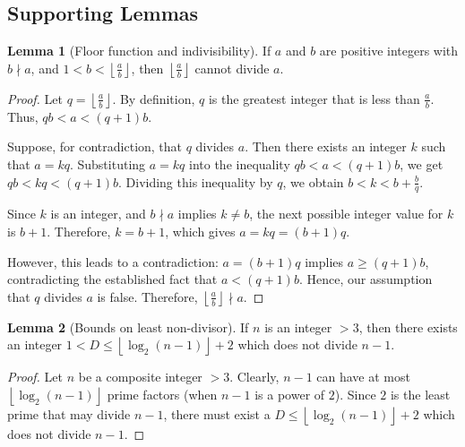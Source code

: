 \documentclass{article}
\theoremstyle{plain}
\theoremstyle{definition}
\newtheorem{lemma}{Lemma}
\begin{document}
\subsection{Supporting Lemmas}

\begin{lemma}[Floor function and indivisibility]
\label{lemma:floornondivisor}
If \(a\) and \(b\) are positive integers with \(b \nmid a\), 
and \( 1 < b < \left\lfloor \frac{a}{b} \right\rfloor \), then \(\left\lfloor \frac{a}{b} \right\rfloor\) 
cannot divide \(a\).
\end{lemma}
\begin{proof}
Let \(q = \left\lfloor \frac{a}{b} \right\rfloor\). By definition, \(q\) is the greatest integer that is less than \(\frac{a}{b}\). Thus, \(qb < a < (q + 1)b\).

Suppose, for contradiction, that \(q\) divides \(a\). Then there exists an integer \(k\) such that \(a = k q\). Substituting \(a = k q\) into the inequality \(qb < a < (q + 1) b\), we get \(qb < kq < (q + 1) b\). Dividing this inequality by \(q\), we obtain \(b < k < b + \frac{b}{q}\).

Since \(k\) is an integer, and \(b \nmid a\) implies \(k \neq b\), the next possible integer value for \(k\) is \(b + 1\). Therefore, \(k = b + 1\), which gives \(a = k q = (b + 1) q\). 

However, this leads to a contradiction: \(a = (b + 1) q\) implies \(a \geq (q + 1) b\), contradicting the established fact that \(a < (q + 1) b\). Hence, our assumption that \(q\) divides \(a\) is false. Therefore, \(\left\lfloor \frac{a}{b} \right\rfloor \nmid a\).
\end{proof}

\begin{lemma}[Bounds on least non-divisor] \label{lemma:leastnondivisor}
If $n$ is an integer $> 3$, then there exists an integer $1 < D \leq \left\lfloor\log_2(n-1)\right\rfloor + 2$ which does not divide $n-1$.
\end{lemma}
\begin{proof}
Let $n$ be a composite integer $> 3$. Clearly, $n-1$ can have at most $\left\lfloor\log_2(n-1)\right\rfloor$ prime factors (when $n-1$ is a power of $2$). Since $2$ is the least prime that may divide $n-1$, there must exist a $D \leq \left\lfloor\log_2(n-1)\right\rfloor + 2$ which does not divide $n-1$.
\end{proof}
\end{document}
